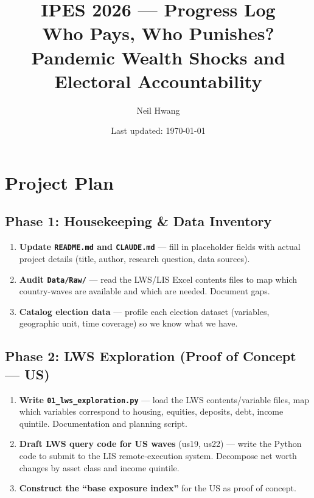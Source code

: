 \documentclass[11pt]{article}
\title{IPES 2026 --- Progress Log\\[4pt]
\large Who Pays, Who Punishes? Pandemic Wealth Shocks and Electoral Accountability}
\author{Neil Hwang}
\date{Last updated: \today}
\begin{document}
\maketitle
\tableofcontents
\newpage

\section{Project Plan}
\label{sec:plan}

\subsection{Phase 1: Housekeeping \& Data Inventory}

\begin{enumerate}
  \item \textbf{Update \texttt{README.md} and \texttt{CLAUDE.md}} --- fill in placeholder fields with actual project details (title, author, research question, data sources).
  \item \textbf{Audit \texttt{Data/Raw/}} --- read the LWS/LIS Excel contents files to map which country-waves are available and which are needed. Document gaps.
  \item \textbf{Catalog election data} --- profile each election dataset (variables, geographic unit, time coverage) so we know what we have.
\end{enumerate}

\subsection{Phase 2: LWS Exploration (Proof of Concept --- US)}

\begin{enumerate}[resume]
  \item \textbf{Write \texttt{01\_lws\_exploration.py}} --- load the LWS contents/variable files, map which variables correspond to housing, equities, deposits, debt, income quintile. Documentation and planning script.
  \item \textbf{Draft LWS query code for US waves} (us19, us22) --- write the Python code to submit to the LIS remote-execution system. Decompose net worth changes by asset class and income quintile.
  \item \textbf{Construct the ``base exposure index''} for the US as proof of concept.
\end{enumerate}
\end{document}
